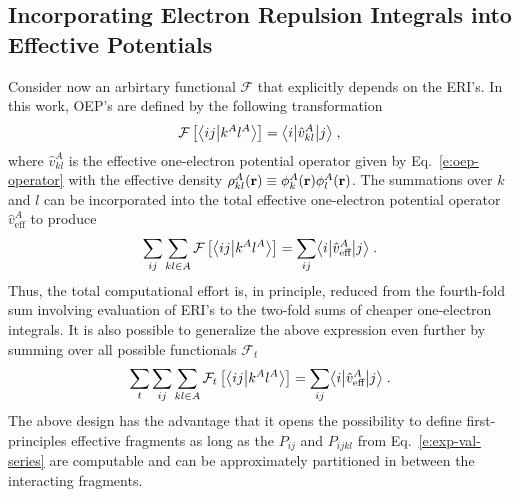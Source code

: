 \subsection{\label{ss:2.3}Incorporating Electron Repulsion Integrals into Effective Potentials}

Consider now an arbirtary functional $\mathcal{F}$ that explicitly depends on the 
ERI's. In this work, OEP's are defined by the following transformation
%
 \begin{equation}
 \mathcal{F}
 \left[ 
   \bigl\langle {ij} \bigl\lvert {k^Al^A} \bigr\rangle
	 \right] = \bigl\langle {i} \bigl\lvert {\hat{v}_{kl}^A} \bigl\lvert {j} \bigr\rangle  \;,
 \end{equation}
%
where 
$\hat{v}_{kl}^A$ is the effective one-electron potential operator given by Eq.~\eqref{e:oep-operator} 
with the
effective density $\rho_{kl}^A({\bf r}) \equiv \phi_k^A({\bf r})\phi_l^A({\bf r})$.
The summations over $k$ and $l$ can be incorporated into the total effective one-electron potential operator
$\hat{v}_{\text{eff}}^A$
to produce
%
\begin{equation}
	\sum_{ij}\sum_{kl\in A} \mathcal{F}\left[ 
   \bigl\langle {ij} \bigl\lvert {k^Al^A} \bigr\rangle
 \right] = \sum_{ij} \bigl\langle {i} \bigl\lvert {\hat{v}_{\text{eff}}^A} \bigl\lvert {j} \bigr\rangle  \;.
\end{equation}
%
Thus, the total computational effort is, in principle, reduced from the fourth-fold
sum involving evaluation of ERI's to the two-fold sums of cheaper one-electron integrals.
It is also possible to generalize the above expression even further by
summing over all possible functionals ${\mathcal{F}}_t$
%
\begin{equation} \label{e:ft-reduction}
	\sum_t \sum_{ij}\sum_{kl\in A} {\mathcal{F}}_t\left[ 
   \bigl\langle {ij} \bigl\lvert {k^Al^A} \bigr\rangle
 \right] = \sum_{ij} \bigl\langle {i} \bigl\lvert {\hat{v}_{\text{eff}}^A} \bigl\lvert {j} \bigr\rangle \;.
\end{equation}
%
The above design has the advantage that it opens the possibility to define first\hyp{}principles
effective fragments as long as the $P_{ij}$ and $P_{ijkl}$ 
from Eq.~\eqref{e:exp-val-series} are computable and can be approximately
partitioned in between the interacting fragments.



